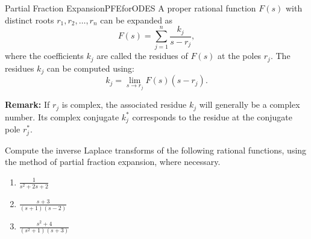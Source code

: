 \bigskip

\begin{propColor}{Partial Fraction Expansion}{PFEforODES}
A proper rational function \(F(s)\) with distinct roots \(r_1, r_2, \dots, r_n\) can be expanded as
\[
F(s) = \sum_{j=1}^n \frac{k_j}{s - r_j},
\]
where the coefficients \(k_j\) are called the residues of \(F(s)\) at the poles \(r_j\). The residues \(k_j\) can be computed using:
\[
k_j = \lim_{s \to r_j} F(s) (s - r_j).
\]

\textbf{Remark:} If \(r_j\) is complex, the associated residue \(k_j\) will generally be a complex number. Its complex conjugate \(k_j^\ast\) corresponds to the residue at the conjugate pole \({r}^\ast_j\). \\

\end{propColor}

\bigskip 

\begin{example}
Compute the inverse Laplace transforms of the following rational functions, using the method of partial fraction expansion, where necessary.
\begin{enumerate}
\renewcommand{\labelenumi}{(\alph{enumi})}
\setlength{\itemsep}{.2cm}
    \item \(\frac{1}{s^2 + 2s + 2}\)
    \item \(\frac{s + 3}{(s + 1)(s - 2)}\)
    \item \(\frac{s^2 + 4}{(s^2 + 1)(s + 3)}\)
\end{enumerate}
\end{example}

